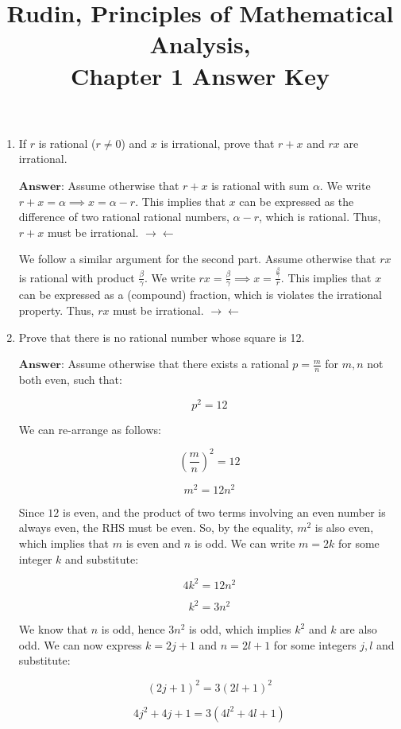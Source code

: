 \documentclass[12pt]{article}
\title{Rudin, Principles of Mathematical Analysis,\\Chapter 1 Answer Key}
\date{}
\begin{document}
\maketitle

\begin{enumerate}
    \item If $r$ is rational ($r \neq 0$) and $x$ is irrational, prove that $r + x$ and $rx$ are irrational.
    
    $\textbf{Answer:}$ Assume otherwise that $r + x$ is rational with sum $\alpha$. We write $r + x = \alpha \implies x = \alpha - r$. This implies that $x$
    can be expressed as the difference of two rational rational numbers, $\alpha - r$, which is rational. Thus, $r + x$ must be irrational. $\rightarrow \leftarrow$

    We follow a similar argument for the second part. Assume otherwise that $rx$ is rational with product $\frac{\beta}{\gamma}$. We write $rx = \frac{\beta}{\gamma} \implies x = \frac{\frac{\beta}{\gamma}}{r}$. This
    implies that $x$ can be expressed as a (compound) fraction, which is violates the irrational property. Thus, $rx$ must be irrational. $\rightarrow \leftarrow$

    \item Prove that there is no rational number whose square is 12.
    
    $\textbf{Answer:}$ Assume otherwise that there exists a rational $p = \frac{m}{n}$ for $m,n$ not both even, such that:

    \[p^2 = 12\]

    We can re-arrange as follows:
    
    \[\left(\frac{m}{n}\right)^2 = 12\]

    \[m^2 = 12n^2\]

    Since $12$ is even, and the product of two terms involving an even number is always even, the RHS must be even.
    So, by the equality, $m^2$ is also even, which implies that $m$ is even and $n$ is odd.
    We can write $m = 2k$ for some integer $k$ and substitute:

    \[4k^2 = 12n^2\]

    \[k^2 = 3n^2\]

    We know that $n$ is odd, hence $3n^2$ is odd, which implies $k^2$ and $k$ are also odd. We can now express $k = 2j + 1$ and $n = 2l + 1$ for some integers $j, l$ and substitute:

    \[\left(2j + 1\right)^2 = 3\left(2l + 1\right)^2\]

    \[4j^2 + 4j + 1 = 3\left(4l^2 + 4l + 1\right)\]


\end{enumerate}
\end{document}
